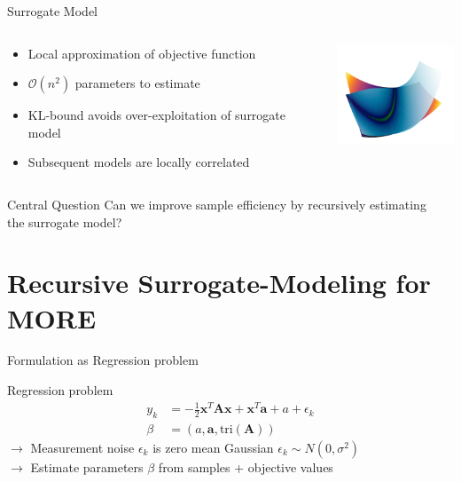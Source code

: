 \documentclass[navbarinfooter, 12pt]{sdqbeamer}
\begin{document}
\begin{frame}{Surrogate Model}
\begin{columns}[c]
  \begin{column}{8cm}
    \begin{itemize}
    \item Local approximation of objective function
    \item $\mathcal{O}(n^2)$ parameters to estimate
    \item KL-bound avoids over-exploitation of surrogate model
    \item Subsequent models are locally correlated      
    \end{itemize}
  \end{column}
  \begin{column}{5cm}
    \includegraphics[height=3cm]{figures/Surrogate_Model.png}
  \end{column}
\end{columns}
  \begin{alertblock}{Central Question}
    Can we improve sample efficiency by recursively estimating \\
    the surrogate model?
  \end{alertblock}
\end{frame}


\section{Recursive Surrogate-Modeling for MORE}

\begin{frame}{Formulation as Regression problem}
  \begin{block}{Regression problem}
    \begin{align*}
      y_k &=  -\frac{1}{2} \mathbf{x}^T \mathbf{A} \mathbf{x} + \mathbf{x}^T \mathbf{a} + a + \epsilon_k \\
      \beta &= (a, \mathbf{a}, \text{tri}(\mathbf{A}))
    \end{align*}
   $\rightarrow$ Measurement noise $\epsilon_k$ is zero mean
   Gaussian $\epsilon_k \sim N(0, \sigma^2)$ \\
   $\rightarrow$ Estimate parameters $\beta$ from samples + objective values
  \end{block}
\end{frame}
\end{document}
